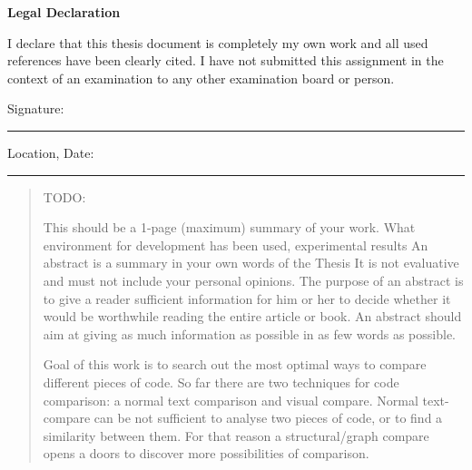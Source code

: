 \documentclass{report}
\begin{document}
\doublespacing
\null\vfil
\begin{center}{\huge\bf Legal Declaration\par}\end{center}
\null
I declare that this thesis document is completely my own work and all used references have been clearly cited. I have not submitted this assignment in the context of an examination to any other examination board or person.\\[2.5cm]

\begin{flushleft}
Signature:\\
\rule[1em]{25em}{0.5pt} %
 
Location, Date:\\
\rule[1em]{25em}{0.5pt} %
\end{flushleft}


\newpage
\pagestyle{fancy}
\fancyhead{}
\renewcommand{\headrulewidth}{0pt}
\renewcommand{\footrulewidth}{0.4pt}
\begin{abstract}
\large

TODO:
\par 
This should be a 1-page (maximum) summary of your work. What environment for development has been used, experimental results 
An abstract is a summary in your own words of the Thesis It is not evaluative and must not include your personal opinions. The purpose of an abstract is to give a reader sufficient information for him or her to decide whether it would be worthwhile reading the entire article or book. An abstract should aim at giving as much information as possible in as few words as possible. 
\par 
Goal of this work is to search out the most optimal ways to compare different pieces of code. So far there are two techniques for code comparison: a normal text comparison and visual compare. Normal text-compare can be not sufficient to analyse two pieces of code, or to find a similarity between them. For that reason a structural/graph compare opens a doors to discover more possibilities of comparison. 

\end{abstract}
\end{document}

